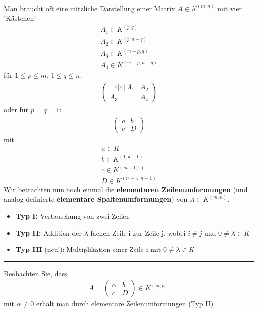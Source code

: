 \documentclass[11pt]{report}
\newcommand*\f[1] {\textbf{#1}}
\begin{document}
\paragraph{}
Man braucht oft eine nützliche Darstellung einer Matrix $A \in K^{(m,n)}$ mit vier 'Kästchen'
\begin{align}
 A_1 \in K^{(p,q)}\\
 A_2 \in K^{(p,n-q)}\\
 A_3 \in K^{(m-p,q)}\\
 A_4 \in K^{(m-p,n-q)}
\end{align}
für $1 \leq p \leq m$, $1 \leq q \leq n$.
\begin{align}
\begin{pmatrix}[c|c] A_1 & A_2 \\ \hline A_3 & A_4 \end{pmatrix}
\end{align}
oder für $p = q = 1$:
\begin{align}
\begin{pmatrix} a & b \\ c & D \end{pmatrix}
\end{align}
mit
\begin{align}
 a \in K\\
 b \in K^{(1,n-1)}\\
 c \in K^{(m-1,1)}\\
 D \in K^{(m-1,n-1)}
\end{align}
Wir betrachten nun noch einmal die \f{elementaren Zeilenumformungen} (und analog definierte \f{elementare Spaltenumformungen}) von $A \in K^{(m,n)}$.
\begin{itemize}
\item \f{Typ I:} Vertauschung von zwei Zeilen
\item \f{Typ II:} Addition der $\lambda$-fachen Zeile i zur Zeile j, wobei $i \neq j$ und $0 \neq \lambda \in K$
\item \f{Typ III} (neu!): Multiplikation einer Zeile i mit $0 \neq \lambda \in K$
\end{itemize}
\vspace*{0.2cm}\rule{\linewidth}{0.3mm}\vspace{0.2cm}
Beobachten Sie, dass
\begin{align}
A = \begin{pmatrix} \alpha & b \\ c & D \end{pmatrix} \in K^{(m,n)}
\end{align}
mit $\alpha \neq 0$  erhält man durch elementare Zeilenumformungen (Typ II)
\end{document}
